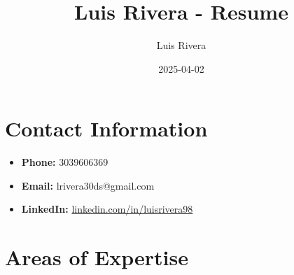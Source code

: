 \documentclass[
  letterpaper,
  DIV=11,
  numbers=noendperiod]{scrartcl}
\title{Luis Rivera - Resume}
\author{Luis Rivera}
\date{2025-04-02}
\providecommand{\tightlist}{%
  \setlength{\itemsep}{0pt}\setlength{\parskip}{0pt}}\usepackage{longtable,booktabs,array}
\begin{document}
\maketitle


\section{Contact Information}\label{contact-information}

\begin{itemize}
\tightlist
\item
  \textbf{Phone:} 3039606369\\
\item
  \textbf{Email:} lrivera30ds@gmail.com\\
\item
  \textbf{LinkedIn:}
  \href{https://linkedin.com/in/luisrivera98}{linkedin.com/in/luisrivera98}
\end{itemize}

\section{Areas of Expertise}\label{areas-of-expertise}
\end{document}
